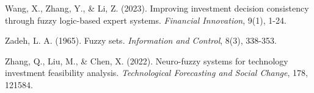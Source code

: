 \documentclass{article}
\begin{document}
\begin{thebibliography}{99}
Wang, X., Zhang, Y., \& Li, Z. (2023). Improving investment decision consistency through fuzzy logic-based expert systems. \textit{Financial Innovation}, 9(1), 1-24.

Zadeh, L. A. (1965). Fuzzy sets. \textit{Information and Control}, 8(3), 338-353.

Zhang, Q., Liu, M., \& Chen, X. (2022). Neuro-fuzzy systems for technology investment feasibility analysis. \textit{Technological Forecasting and Social Change}, 178, 121584.

\end{thebibliography}
\end{document}

